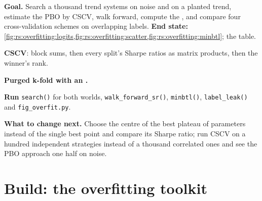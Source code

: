 \begin{tutorial}
\textbf{Goal.} Search a thousand trend systems on noise and on a planted trend, estimate the PBO by CSCV, walk forward, compute the , and
compare four cross-validation schemes on overlapping labels. \textbf{End state:}
\cref{fig:rs:overfitting:logits,fig:rs:overfitting:scatter,fig:rs:overfitting:minbtl}; the table.
\begin{tutsteps}
\item \textbf{CSCV}: block sums, then every split's Sharpe ratios as matrix products, then the winner's  rank.
\label{lst:rs:overfitting:cscv}
\item \textbf{Purged k-fold with an .}
\label{lst:rs:overfitting:purge}
\item \textbf{Run} \texttt{search()} for both worlds, \texttt{walk\_forward\_sr()}, \texttt{minbtl()}, \texttt{label\_leak()} and \texttt{fig\_overfit.py}.
\end{tutsteps}
\textbf{What to change next.} Choose the centre of the best plateau of parameters instead of the single best point and compare its  Sharpe ratio; run
CSCV on a hundred independent strategies instead of a thousand correlated ones and see the PBO approach one half on noise.
\end{tutorial}

\section{Build: the overfitting toolkit}\label{bld:rs:overfitting:overfit}

